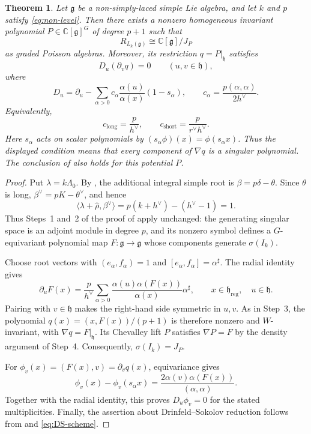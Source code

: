 \documentclass[11pt,reqno]{amsart}
\newtheorem{theorem}{Theorem}
\theoremstyle{remark}
\newcommand{\g}{\mathfrak g}
\newcommand{\h}{\mathfrak h}
\newcommand{\C}{\mathbb C}
\newcommand{\grad}{\nabla}
\begin{document}
\begin{theorem}\label{th:non}
Let $\g$ be a non-simply-laced simple Lie algebra, and let $k$ and
$p$ satisfy \eqref{eq:non-level}. Then there exists a nonzero
homogeneous invariant polynomial $P\in\C[\g]^G$ of degree $p+1$ such
that
\[
R_{L_k(\g)}\cong\C[\g]/J_P
\]
as graded Poisson algebras.
Moreover, its restriction $q=P|_{\h}$ satisfies
\[
D_u(\partial_v q)=0
\qquad (u,v\in\h),
\]
where
\[
D_u
=
\partial_u-
\sum_{\alpha>0}
c_\alpha
\frac{\alpha(u)}{\alpha(x)}(1-s_\alpha),
\qquad
c_\alpha=\frac{p(\alpha,\alpha)}{2h^\vee}.
\]
Equivalently,
\[
c_{\mathrm{long}}=\frac{p}{h^\vee},
\qquad
c_{\mathrm{short}}=\frac{p}{r^\vee h^\vee}.
\]
Here $s_\alpha$ acts on scalar polynomials by
$(s_\alpha\phi)(x)=\phi(s_\alpha x)$. Thus the displayed condition
means that every component of $\grad q$ is a singular polynomial.
The conclusion of  also holds for this potential $P$.
\end{theorem}
\begin{proof}
Put $\lambda=k\Lambda_0$. By \cite[Proposition~2.1]{KW3}, the
additional integral simple root is $\beta=p\delta-\theta$. Since
$\theta$ is long, $\beta^\vee=pK-\theta^\vee$, and hence
\[
\langle\lambda+\widehat\rho,\beta^\vee\rangle
=p(k+h^\vee)-(h^\vee-1)=1.
\]
Thus Steps~1 and~2 of the proof of  apply unchanged:
the generating singular space is an adjoint module in degree $p$,
and its nonzero symbol defines a $G$-equivariant polynomial map
$F:\g\to\g$ whose components generate $\sigma(I_k)$.

Choose root vectors with $(e_\alpha,f_\alpha)=1$ and
$[e_\alpha,f_\alpha]=\alpha^\sharp$. The radial identity gives
\[
\partial_uF(x)=\frac{p}{h^\vee}\sum_{\alpha>0}
\frac{\alpha(u)\alpha(F(x))}{\alpha(x)}\alpha^\sharp,
\qquad x\in\h_{\mathrm{reg}},\quad u\in\h.
\]
Pairing with $v\in\h$ makes the right-hand side symmetric in $u,v$.
As in Step~3, the polynomial
$q(x)=(x,F(x))/(p+1)$ is therefore nonzero and $W$-invariant, with
$\grad q=F|_\h$. Its Chevalley lift $P$ satisfies $\grad P=F$ by
the density argument of Step~4. Consequently, $\sigma(I_k)=J_P$.

For $\phi_v(x)=(F(x),v)=\partial_vq(x)$, equivariance gives
\[
\phi_v(x)-\phi_v(s_\alpha x)
=\frac{2\alpha(v)\alpha(F(x))}{(\alpha,\alpha)}.
\]
Together with the radial identity, this proves $D_u\phi_v=0$ for the
stated multiplicities. Finally, the assertion about
Drinfeld--Sokolov reduction follows from  and
\eqref{eq:DS-scheme}.
\end{proof}
\end{document}
